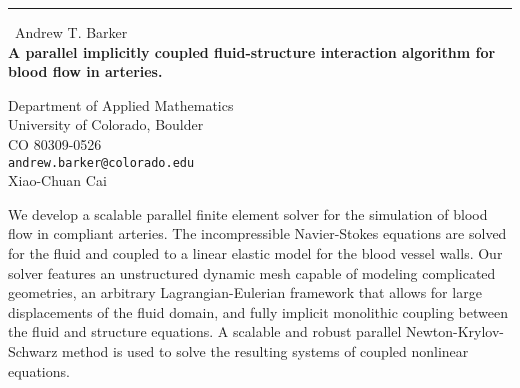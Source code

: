 \documentclass{report}
\begin{document}
\begin{center}
\rule{6in}{1pt} \
{\large Andrew T. Barker \\
{\bf A parallel implicitly coupled fluid-structure interaction algorithm for blood flow in arteries.
}}

Department of Applied Mathematics \\ University of Colorado, Boulder \\ 
CO 80309-0526
\\
{\tt andrew.barker@colorado.edu}\\
Xiao-Chuan Cai
\end{center}

We develop a scalable parallel finite element solver for the simulation of blood flow in compliant arteries.  The incompressible Navier-Stokes equations are solved for the fluid and coupled to a linear elastic model for the blood vessel walls.  Our solver features an unstructured dynamic mesh capable of modeling complicated geometries, an arbitrary Lagrangian-Eulerian framework that allows for large displacements of the fluid domain, and fully implicit monolithic coupling between the fluid and structure equations.  A scalable and robust parallel Newton-Krylov-Schwarz method is used to solve the resulting systems of coupled nonlinear equations.
\end{document}
